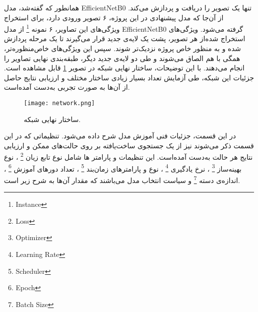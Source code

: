 همانطور که گفته‌شد، مدل EfficientNetB0 تنها یک تصویر را دریافت و پردازش می‌کند.
از آن‌جا که مدل پیشنهادی در این پروژه، ۶ تصویر ورودی دارد، برای استخراج ویژگی‌های این تصاویر، ۶ نمونه
\footnote{Instance}
از مدل EfficientNetB0 گرفته می‌شود.
ویژگی‌های استخراج شده‌از هر تصویر، پشت یک لایه‌ی 
جدید قرار می‌گیرند تا یک مرحله پردازش شده و به منظور خاص پروژه نزدیک‌تر شوند.
سپس این ویژگی‌های خاص‌منظوره‌تر، همگی با هم الصاق می‌شوند و طی دو لایه‌ی جدید دیگر، طبقه‌بندی نهایی تصاویر را انجام می‌دهند.
با این توضیحات، ساختار نهایی شبکه در تصویر \ref{fig:network}
قابل مشاهده است.
جزئیات این شبکه، 
طی آزمایش تعداد بسیار زیادی ساختار مختلف و ارزیابی نتایج حاصل از آن‌ها به صورت تجربی به‌دست آمده‌است.

\begin{figure}[ht]
\centering
\texttt{[image: network.png]}
\caption[]{ساختار نهایی شبکه.}
\label{fig:network}
\end{figure}


در این قسمت، جزئیات فنی آموزش مدل شرح داده می‌شود.
تنظیماتی که در این قسمت ذکر می‌شوند نیز از یک جستجوی ساخت‌یافته بر روی حالت‌های ممکن و ارزیابی نتایج هر حالت به‌دست آمده‌است.
این تنظیمات و پارامتر ها شامل 
نوع تابع زیان
\footnote{Loss}
،
نوع بهینه‌ساز
\footnote{Optimizer}
، نرخ یادگیری
\footnote{Learning Rate}
،
نوع و پارامتر‌های زمان‌بند
\footnote{Scheduler}
،
تعداد دور‌های آموزش
\footnote{Epoch}
، 
اندازه‌ی دسته
\footnote{Batch Size}
و 
سیاست انتخاب مدل می‌باشند که مقدار آن‌ها به شرح زیر است.\\

